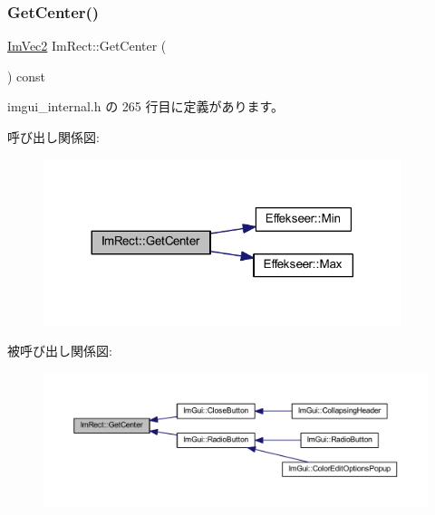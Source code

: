 \subsubsection{\texorpdfstring{Get\+Center()}{GetCenter()}}
{\footnotesize\ttfamily \mbox{\hyperlink{struct_im_vec2}{Im\+Vec2}} Im\+Rect\+::\+Get\+Center (\begin{DoxyParamCaption}{ }\end{DoxyParamCaption}) const\hspace{0.3cm}{\ttfamily [inline]}}



 imgui\+\_\+internal.\+h の 265 行目に定義があります。

呼び出し関係図\+:\nopagebreak
\begin{figure}[H]
\begin{center}
\leavevmode
\includegraphics[width=296pt]{struct_im_rect_aae13f8003184fd84f29d27c3c074cf43_cgraph}
\end{center}
\end{figure}
被呼び出し関係図\+:\nopagebreak
\begin{figure}[H]
\begin{center}
\leavevmode
\includegraphics[width=350pt]{struct_im_rect_aae13f8003184fd84f29d27c3c074cf43_icgraph}
\end{center}
\end{figure}
\mbox{\label{struct_im_rect_a223c67d4c93e5c87a33a68ebb527bbb8}} 
